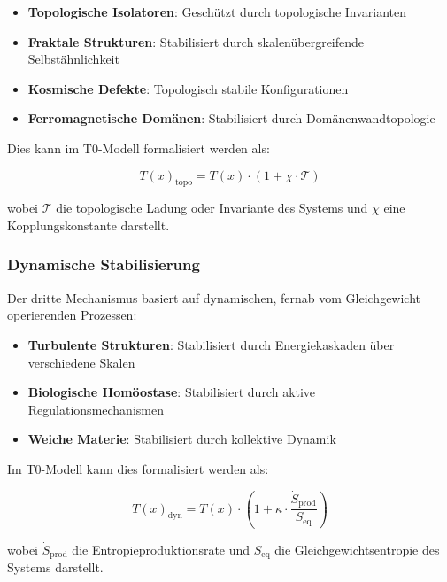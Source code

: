 \documentclass[12pt,a4paper]{article}
\newcommand{\Tfield}{T(x)}
\begin{document}
	\begin{itemize}
		\item \textbf{Topologische Isolatoren}: Geschützt durch topologische Invarianten
		\item \textbf{Fraktale Strukturen}: Stabilisiert durch skalenübergreifende Selbstähnlichkeit
		\item \textbf{Kosmische Defekte}: Topologisch stabile Konfigurationen
		\item \textbf{Ferromagnetische Domänen}: Stabilisiert durch Domänenwandtopologie
	\end{itemize}
	
	Dies kann im T0-Modell formalisiert werden als:
	
	\begin{equation}
		\Tfield_{\text{topo}} = \Tfield \cdot (1 + \chi \cdot \mathcal{T})
	\end{equation}
	
	wobei $\mathcal{T}$ die topologische Ladung oder Invariante des Systems und $\chi$ eine Kopplungskonstante darstellt.
	
	\subsubsection{Dynamische Stabilisierung}
	\label{subsubsec:dyn_stabilisierung}
	
	Der dritte Mechanismus basiert auf dynamischen, fernab vom Gleichgewicht operierenden Prozessen:
	
	\begin{itemize}
		\item \textbf{Turbulente Strukturen}: Stabilisiert durch Energiekaskaden über verschiedene Skalen
		\item \textbf{Biologische Homöostase}: Stabilisiert durch aktive Regulationsmechanismen
		\item \textbf{Weiche Materie}: Stabilisiert durch kollektive Dynamik
	\end{itemize}
	
	Im T0-Modell kann dies formalisiert werden als:
	
	\begin{equation}
		\Tfield_{\text{dyn}} = \Tfield \cdot \left(1 + \kappa \cdot \frac{\dot{S}_{\text{prod}}}{S_{\text{eq}}}\right)
	\end{equation}
	
	wobei $\dot{S}_{\text{prod}}$ die Entropieproduktionsrate und $S_{\text{eq}}$ die Gleichgewichtsentropie des Systems darstellt.
	
\end{document}
